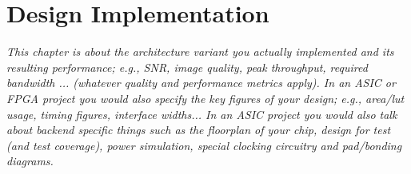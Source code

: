 

\chapter{Design Implementation}
\textit{This chapter is about the architecture variant you actually
implemented and its resulting performance; e.g., SNR, image quality,
peak throughput, required bandwidth ... (whatever quality and
performance metrics apply). In an ASIC or FPGA project you would also
specify the key figures of your design; e.g., area/lut usage, timing
figures, interface widths... In an ASIC project you would also talk
about backend specific things such as the floorplan of your chip,
design for test (and test coverage), power simulation, special
clocking circuitry and pad/bonding diagrams.}


